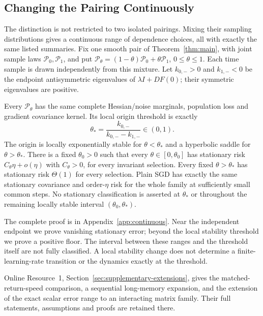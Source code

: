 \subsection{Changing the Pairing Continuously}
\label{sec:continuous-copula}
The distinction is not restricted to two isolated pairings. Mixing their
sampling distributions gives a continuous range of dependence choices,
all with exactly the same listed summaries. Fix one smooth pair of
Theorem~\ref{thm:main}, with joint sample laws $\mathcal P_0,\mathcal P_1$, and put
$\mathcal P_\theta=(1-\theta)\mathcal P_0+\theta\mathcal P_1$,
$0\leq\theta\leq1$. Each time sample is drawn independently from this
mixture. Let $k_{0,-}>0$ and $k_{1,-}<0$ be the endpoint antisymmetric
eigenvalues of $\lambda I+DF(0)$; their symmetric eigenvalues are positive.

\begin{corollary}
\label{cor:continuous-copula-phases}
Every $\mathcal P_\theta$ has the same complete Hessian/noise marginals,
population loss and gradient covariance kernel. Its local origin threshold
is exactly
\begin{equation}\label{eq:copula-local-threshold}
 \theta_* =\frac{k_{0,-}}{k_{0,-}-k_{1,-}}\in(0,1).
\end{equation}
The origin is locally exponentially stable for $\theta<\theta_*$ and a
hyperbolic saddle for $\theta>\theta_*$. There is a fixed $\theta_0>0$
such that every $\theta\in[0,\theta_0]$ has stationary risk
$C_\theta\eta+o(\eta)$ with $C_\theta>0$, for every invariant selection.
Every fixed $\theta>\theta_*$ has stationary risk $\Theta(1)$ for every
selection. Plain SGD has exactly the same stationary covariance and
order-$\eta$ risk for the whole family at sufficiently small common steps.
No stationary classification is asserted at $\theta_*$ or throughout the
remaining locally stable interval $(\theta_0,\theta_*)$.
\end{corollary}
The complete proof is in Appendix~\ref{app:continuous}. Near the independent
endpoint we prove vanishing stationary error; beyond the local stability
threshold we prove a positive floor. The interval between these ranges and
the threshold itself are not fully classified. A local stability change
does not determine a finite-learning-rate transition or the dynamics
exactly at the threshold.

Online Resource~1, Section~\ref{sec:supplementary-extensions}, gives the
matched-return-speed comparison, a sequential long-memory expansion, and
the extension of the exact scalar error range to an interacting matrix
family. Their full statements, assumptions and proofs are retained there.


